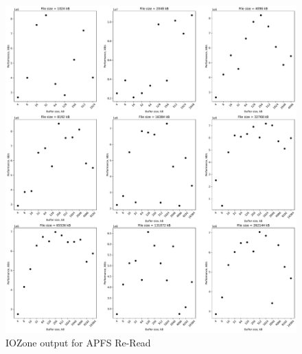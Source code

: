 \begin{figure}[!htb]
	\label{fig:bench_apfs_re_read}
	\begin{center}
		\includegraphics[width=1.0\textwidth]{figures/benchmarking/local/Re-Read.pdf}
	\end{center}
	\caption{IOZone output for \gls{APFS} \mbox{Re-Read}}
\end{figure}

